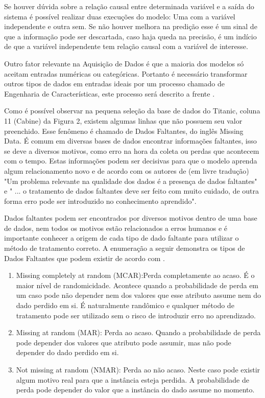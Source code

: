 Se houver dúvida sobre a relação causal entre determinada variável e a saída do sistema é possível realizar duas execuções do modelo: Uma com a variável independente e outra sem. Se não houver melhora na predição esse é um sinal de que a informação pode ser descartada, caso haja queda na precisão, é um indício de que a variável independente tem relação causal com a variável de interesse.

Outro fator relevante na Aquisição de Dados é que a maioria dos modelos só aceitam entradas numéricas ou categóricas. Portanto é necessário transformar outros tipos de dados em entradas ideais por um processo chamado de Engenharia de Características, este processo será descrito a frente \cite{real2013}. 

Como é possível observar na pequena seleção da base de dados do Titanic, coluna 11 (Cabine) da Figura 2, existem algumas linhas que não possuem seu valor preenchido. Esse fenômeno é chamado de Dados Faltantes, do inglês Missing Data. É comum em diversas bases de dados encontrar informações faltantes, isso se deve a diversos motivos, como erro na hora da coleta ou perdas que acontecem com o tempo. Estas informações podem ser decisivas para que o modelo aprenda algum relacionamento novo e de acordo com os autores de  (em livre tradução) "Um problema relevante na qualidade dos dados é a presença de dados faltantes" e " ... o tratamento de dados faltantes deve ser feito com muito cuidado, de outra forma erro pode ser introduzido no conhecimento aprendido". 

Dados faltantes podem ser encontrados por diversos motivos dentro de uma base de dados, nem todos os motivos estão relacionados a erros humanos e é importante conhecer a origem de cada tipo de dado faltante para utilizar o método de tratamento correto. A enumeração a seguir demonstra os tipos de Dados Faltantes que podem existir de acordo com \cite{stat1987}.

\begin{enumerate}
\item Missing completely at random (MCAR):Perda completamente ao acaso. É o maior nível de randomicidade. Acontece quando a probabilidade de perda em um caso pode não depender nem dos valores que esse atributo assume nem do dado perdido em si. É naturalmente randômico e qualquer método de tratamento pode ser utilizado sem o risco de introduzir erro no aprendizado.
\item Missing at random (MAR): Perda ao acaso. Quando a probabilidade de perda pode depender dos valores que atributo pode assumir, mas não pode depender do dado perdido em si.
\item Not missing at random (NMAR): Perda ao não acaso. Neste caso pode existir algum motivo real para que a instância esteja perdida. A probabilidade de perda pode depender do valor que a instância do dado assume no momento.
\end{enumerate}

